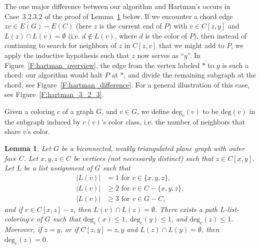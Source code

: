 \documentclass[12pt,letterpaper]{article}
\theoremstyle{plain}
\newtheorem{lemma}{Lemma}[section]           %
\theoremstyle{definition}
\theoremstyle{break}
\begin{document}
The one major difference between
our algorithm and Hartman's
occurs in Case~3.2.3.2 of the proof of Lemma~\ref{L:hartman3} below.
If we encounter a chord edge $zv\in E(G)-E(C)$
(here $z$ is the current end of $P$) with
$v\in C[z,y]$ and $L(z)\cap L(v)=\emptyset$ (i.e. $d\not\in L(v)$,
where $d$ is the color of $P$),
then instead of continuing to
search for neighbors of $z$ in $C[z,v]$ that we might add
to $P$, we
apply the inductive hypothesis such that $z$ now serves as
``$y$''.
In Figure~\ref{F:hartman_overview},
the edge from the vertex labeled $*$ to $y$
is such a chord: our algorithm would halt
$P$ at $*$, and divide the remaining subgraph at the chord,
see Figure~\ref{F:hartman_difference}.
For a general illustration of this case, see Figure~\ref{F:hartman_3_2_3}.

Given a coloring $c$ of a graph $G$, and $v\in G$, we define
$\text{deg}_c(v)$
to be $\text{deg}(v)$ in the subgraph induced by $c(v)$'s color class,
i.e. the number of neighbors that share $v$'s color.

\begin{lemma}\label{L:hartman3}
Let $G$ be a biconnected, weakly triangulated plane graph with outer face
$C$. Let $x,y,z\in C$ be vertices (not necessarily distinct) such that
$z\in C[x,y]$. Let $L$ be a list assignment of $G$ such that
\begin{align*}
    |L(v)| &= 1 \text{ for } v\in\{x,y,z\},\\
    |L(v)| &\ge 2 \text{ for } v\in C-\{x,y,z\},\\
    |L(v)| &\ge 3 \text{ for } v\in G-C,
\end{align*}
and if $v\in C[x,z]-z$, then $L(v)\cap L(z)=\emptyset$.
There exists a path $L$-list-coloring $c$ of $G$ such that $\text{deg}_c(x)\le 1$,
$\text{deg}_c(y)\le 1$, and $\text{deg}_c(z)\le 1$. Moreover,
if $z=y$, or if $C[z,y]=z,y$ and $L(z)\cap L(y)=\emptyset$,
then $\text{deg}_c(z)=0$.
\end{lemma}
\end{document}
